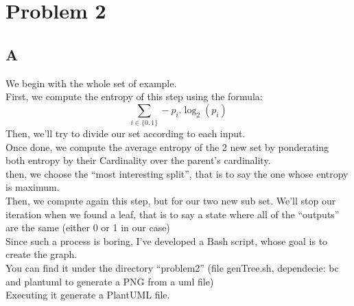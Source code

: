 \documentclass{article}
\begin{document}
    \section{Problem 2}
        \subsection{A}
            We begin with the whole set of example.\\
            First, we compute the entropy of this step using the formula:
            \[
                \sum_{i\in\{0, 1\}} -p_i.\log_2(p_i)
            \]
            Then, we'll try to divide our set according to each input.\\
            Once done, we compute the average entropy of the 2 new set by ponderating both entropy by their Cardinality over the parent's cardinality.\\
            then, we choose the ``most interesting split'', that is to say the one whose entropy is maximum.\\

            Then, we compute again this step, but for our two new sub set. We'll stop our iteration when we found a leaf, that is to say a state where all of the ``outputs'' are the same (either 0 or 1 in our case)\\
            
            Since such a process is boring, I've developed a Bash script, whose goal is to create the graph.\\
            You can find it under the directory ``problem2'' (file genTree.sh, dependecie: bc and plantuml to generate a PNG from a uml file)\\
            Executing it generate a PlantUML file.\\
\end{document}
